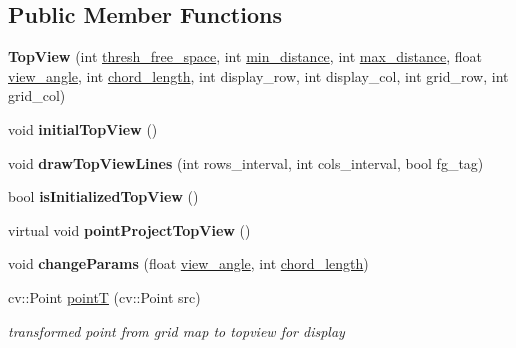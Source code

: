 \subsection*{Public Member Functions}
\begin{DoxyCompactItemize}
\item 
\hypertarget{class_top_view_a7bf56ae4f4ee2cf40dafd6a82707a281}{}{\bfseries Top\+View} (int \hyperlink{class_top_view_a0be83119f0e81bbfd89f75b6d271eb2b}{thresh\+\_\+free\+\_\+space}, int \hyperlink{class_top_view_a56c819ab3208d77a4b6f9dff80339524}{min\+\_\+distance}, int \hyperlink{class_top_view_a4d6987318631da634e6121bc563d5bfb}{max\+\_\+distance}, float \hyperlink{class_top_view_a1ad1a34440fcfb86672427e97b03870b}{view\+\_\+angle}, int \hyperlink{class_top_view_a7b492b7926c48542bdad6610a602eadc}{chord\+\_\+length}, int display\+\_\+row, int display\+\_\+col, int grid\+\_\+row, int grid\+\_\+col)\label{class_top_view_a7bf56ae4f4ee2cf40dafd6a82707a281}

\item 
\hypertarget{class_top_view_a565c1500b449240cd16bf9bdbb7ea96e}{}void {\bfseries initial\+Top\+View} ()\label{class_top_view_a565c1500b449240cd16bf9bdbb7ea96e}

\item 
\hypertarget{class_top_view_a3a88db97144313b0f8c42fb07dc20468}{}void {\bfseries draw\+Top\+View\+Lines} (int rows\+\_\+interval, int cols\+\_\+interval, bool fg\+\_\+tag)\label{class_top_view_a3a88db97144313b0f8c42fb07dc20468}

\item 
\hypertarget{class_top_view_ab3c9e49395d1ce23367c8668164549c1}{}bool {\bfseries is\+Initialized\+Top\+View} ()\label{class_top_view_ab3c9e49395d1ce23367c8668164549c1}

\item 
\hypertarget{class_top_view_aa9ec86935067642bced8bc202e5a3b7c}{}virtual void {\bfseries point\+Project\+Top\+View} ()\label{class_top_view_aa9ec86935067642bced8bc202e5a3b7c}

\item 
\hypertarget{class_top_view_ace2839bba9b0a4602a841a5794ab249c}{}void {\bfseries change\+Params} (float \hyperlink{class_top_view_a1ad1a34440fcfb86672427e97b03870b}{view\+\_\+angle}, int \hyperlink{class_top_view_a7b492b7926c48542bdad6610a602eadc}{chord\+\_\+length})\label{class_top_view_ace2839bba9b0a4602a841a5794ab249c}

\item 
\hypertarget{class_top_view_a4d1f8c93ed36cabd27c8e7d51c29c62d}{}cv\+::\+Point \hyperlink{class_top_view_a4d1f8c93ed36cabd27c8e7d51c29c62d}{point\+T} (cv\+::\+Point src)\label{class_top_view_a4d1f8c93ed36cabd27c8e7d51c29c62d}

\begin{DoxyCompactList}\small\item\em transformed point from grid map to topview for display \end{DoxyCompactList}\end{DoxyCompactItemize}
